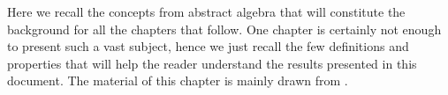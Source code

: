 Here we recall the concepts from abstract algebra that will constitute
the background for all the chapters that follow. One chapter is
certainly not enough to present such a vast subject, hence we just
recall the few definitions and properties that will help the reader
understand the results presented in this document. The material of
this chapter is mainly drawn from
\cite{lang,lidl+niederreiter:2,silverman:elliptic}.






